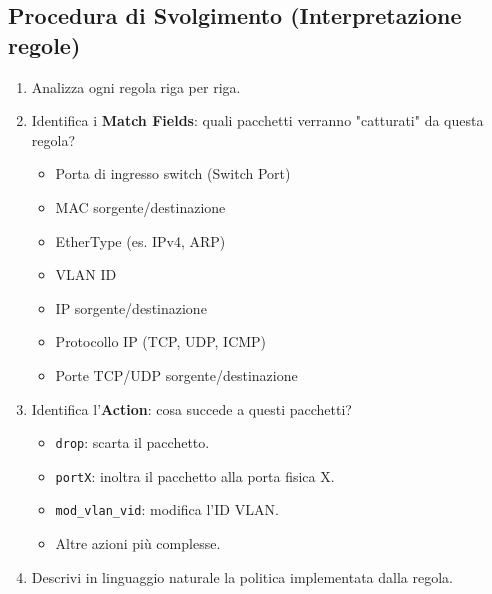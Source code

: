 \subsection{Procedura di Svolgimento (Interpretazione regole)}
\begin{enumerate}[label=\arabic*.]
    \item Analizza ogni regola riga per riga.
    \item Identifica i \textbf{Match Fields}: quali pacchetti verranno "catturati" da questa regola?
    \begin{itemize}
        \item Porta di ingresso switch (Switch Port)
        \item MAC sorgente/destinazione
        \item EtherType (es. IPv4, ARP)
        \item VLAN ID
        \item IP sorgente/destinazione
        \item Protocollo IP (TCP, UDP, ICMP)
        \item Porte TCP/UDP sorgente/destinazione
    \end{itemize}
    \item Identifica l'\textbf{Action}: cosa succede a questi pacchetti?
    \begin{itemize}
        \item \texttt{drop}: scarta il pacchetto.
        \item \texttt{portX}: inoltra il pacchetto alla porta fisica X.
        \item \texttt{mod\_vlan\_vid}: modifica l'ID VLAN.
        \item Altre azioni più complesse.
    \end{itemize}
    \item Descrivi in linguaggio naturale la politica implementata dalla regola.
\end{enumerate}

